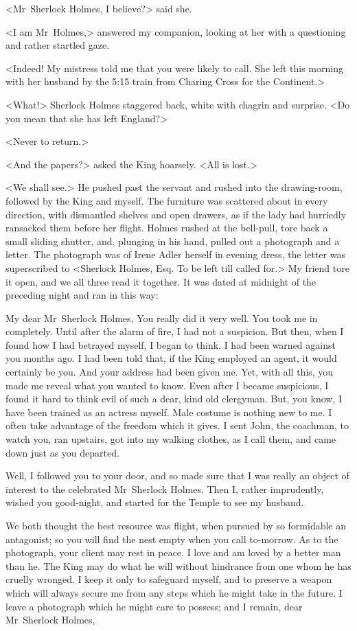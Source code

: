 <Mr~Sherlock Holmes, I believe?> said she.

<I am Mr~Holmes,> answered my companion, looking at her with a questioning and rather startled gaze.

<Indeed! My mistress told me that you were likely to call. She left this morning with her husband by the 5:15 train from Charing Cross for the Continent.>

<What!> Sherlock Holmes staggered back, white with chagrin and surprise. <Do you mean that she has left England?>

<Never to return.>

<And the papers?> asked the King hoarsely. <All is lost.>

<We shall see.> He pushed past the servant and rushed into the drawing-room, followed by the King and myself. The furniture was scattered about in every direction, with dismantled shelves and open drawers, as if the lady had hurriedly ransacked them before her flight. Holmes rushed at the bell-pull, tore back a small sliding shutter, and, plunging in his hand, pulled out a photograph and a letter. The photograph was of Irene Adler herself in evening dress, the letter was superscribed to <Sherlock Holmes, Esq. To be left till called for.> My friend tore it open, and we all three read it together. It was dated at midnight of the preceding night and ran in this way:

\begin{mail}{}{My dear Mr~Sherlock Holmes,}
You really did it very well. You took me in completely. Until after the alarm of fire, I had not a suspicion. But then, when I found how I had betrayed myself, I began to think. I had been warned against you months ago. I had been told that, if the King employed an agent, it would certainly be you. And your address had been given me. Yet, with all this, you made me reveal what you wanted to know. Even after I became suspicious, I found it hard to think evil of such a dear, kind old clergyman. But, you know, I have been trained as an actress myself. Male costume is nothing new to me. I often take advantage of the freedom which it gives. I sent John, the coachman, to watch you, ran upstairs, got into my walking clothes, as I call them, and came down just as you departed.

Well, I followed you to your door, and so made sure that I was really an object of interest to the celebrated Mr~Sherlock Holmes. Then I, rather imprudently, wished you good-night, and started for the Temple to see my husband.

We both thought the best resource was flight, when pursued by so formidable an antagonist; so you will find the nest empty when you call to-morrow. As to the photograph, your client may rest in peace. I love and am loved by a better man than he. The King may do what he will without hindrance from one whom he has cruelly wronged. I keep it only to safeguard myself, and to preserve a weapon which will always secure me from any steps which he might take in the future. I leave a photograph which he might care to possess; and I remain, dear Mr~Sherlock Holmes,
\end{mail}

